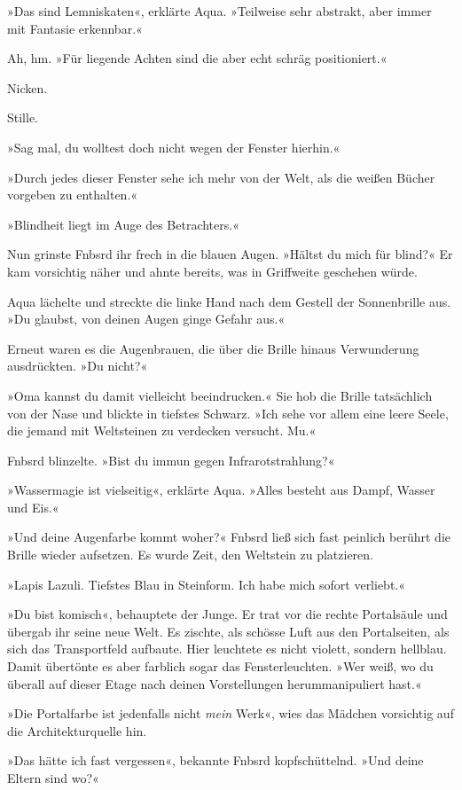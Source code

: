 »Das sind Lemniskaten«, erklärte Aqua. »Teilweise sehr abstrakt, aber immer mit Fantasie erkennbar.«

Ah, hm. »Für liegende Achten sind die aber echt schräg positioniert.«

Nicken.

Stille.

»Sag mal, du wolltest doch nicht wegen der Fenster hierhin.«

»Durch jedes dieser Fenster sehe ich mehr von der Welt, als die weißen Bücher vorgeben zu enthalten.«

»Blindheit liegt im Auge des Betrachters.«

Nun grinste Fnbsrd ihr frech in die blauen Augen. »Hältst du mich für blind?« Er kam vorsichtig näher und ahnte bereits, was in Griffweite geschehen würde.

Aqua lächelte und streckte die linke Hand nach dem Gestell der Sonnenbrille aus. »Du glaubst, von deinen Augen ginge Gefahr aus.«

Erneut waren es die Augenbrauen, die über die Brille hinaus Verwunderung ausdrückten. »Du nicht?«

»Oma kannst du damit vielleicht beeindrucken.« Sie hob die Brille tatsächlich von der Nase und blickte in tiefstes Schwarz. »Ich sehe vor allem eine leere Seele, die jemand mit Weltsteinen zu verdecken versucht. Mu.«

Fnbsrd blinzelte. »Bist du immun gegen Infrarotstrahlung?«

»Wassermagie ist vielseitig«, erklärte Aqua. »Alles besteht aus Dampf, Wasser und Eis.«

»Und deine Augenfarbe kommt woher?« Fnbsrd ließ sich fast peinlich berührt die Brille wieder aufsetzen. Es wurde Zeit, den Weltstein zu platzieren.

»Lapis Lazuli. Tiefstes Blau in Steinform. Ich habe mich sofort verliebt.«

»Du bist komisch«, behauptete der Junge. Er trat vor die rechte Portalsäule und übergab ihr seine neue Welt. Es zischte, als schösse Luft aus den Portalseiten, als sich das Transportfeld aufbaute. Hier leuchtete es nicht violett, sondern hellblau. Damit übertönte es aber farblich sogar das Fensterleuchten. »Wer weiß, wo du überall auf dieser Etage nach deinen Vorstellungen herummanipuliert hast.«

»Die Portalfarbe ist jedenfalls nicht \emph{mein} Werk«, wies das Mädchen vorsichtig auf die Architekturquelle hin.

»Das hätte ich fast vergessen«, bekannte Fnbsrd kopfschüttelnd. »Und deine Eltern sind wo?«

